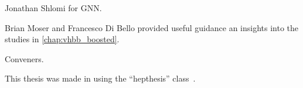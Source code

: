 



Jonathan Shlomi for GNN.

Brian Moser and Francesco Di Bello provided useful guidance an insights into the studies in \cref{chap:vhbb_boosted}.

Conveners.

This thesis was made in \LaTeXe{} using the ``hepthesis'' class~\cite{Buckley:2010:hepthesis}.




